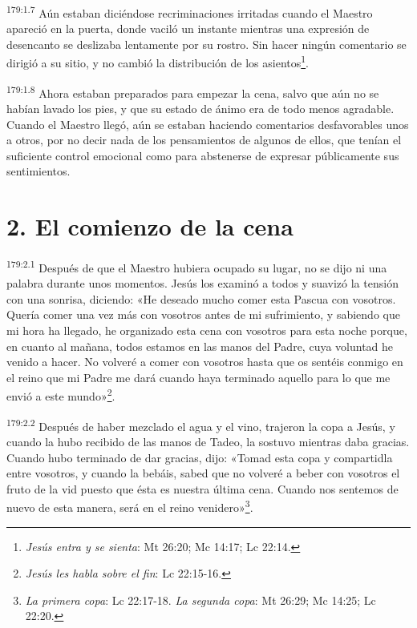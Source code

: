 \par 
\textsuperscript{179:1.7} Aún estaban diciéndose recriminaciones irritadas cuando el Maestro apareció en la puerta, donde vaciló un instante mientras una expresión de desencanto se deslizaba lentamente por su rostro. Sin hacer ningún comentario se dirigió a su sitio, y no cambió la distribución de los asientos\footnote{\textit{Jesús entra y se sienta}: Mt 26:20; Mc 14:17; Lc 22:14.}.

\par 
\textsuperscript{179:1.8} Ahora estaban preparados para empezar la cena, salvo que aún no se habían lavado los pies, y que su estado de ánimo era de todo menos agradable. Cuando el Maestro llegó, aún se estaban haciendo comentarios desfavorables unos a otros, por no decir nada de los pensamientos de algunos de ellos, que tenían el suficiente control emocional como para abstenerse de expresar públicamente sus sentimientos.

\section*{2. El comienzo de la cena}
\par 
\textsuperscript{179:2.1} Después de que el Maestro hubiera ocupado su lugar, no se dijo ni una palabra durante unos momentos. Jesús los examinó a todos y suavizó la tensión con una sonrisa, diciendo: «He deseado mucho comer esta Pascua con vosotros. Quería comer una vez más con vosotros antes de mi sufrimiento, y sabiendo que mi hora ha llegado, he organizado esta cena con vosotros para esta noche porque, en cuanto al mañana, todos estamos en las manos del Padre, cuya voluntad he venido a hacer. No volveré a comer con vosotros hasta que os sentéis conmigo en el reino que mi Padre me dará cuando haya terminado aquello para lo que me envió a este mundo»\footnote{\textit{Jesús les habla sobre el fin}: Lc 22:15-16.}.

\par 
\textsuperscript{179:2.2} Después de haber mezclado el agua y el vino, trajeron la copa a Jesús, y cuando la hubo recibido de las manos de Tadeo, la sostuvo mientras daba gracias. Cuando hubo terminado de dar gracias, dijo: «Tomad esta copa y compartidla entre vosotros, y cuando la bebáis, sabed que no volveré a beber con vosotros el fruto de la vid puesto que ésta es nuestra última cena. Cuando nos sentemos de nuevo de esta manera, será en el reino venidero»\footnote{\textit{La primera copa}: Lc 22:17-18. \textit{La segunda copa}: Mt 26:29; Mc 14:25; Lc 22:20.}.

